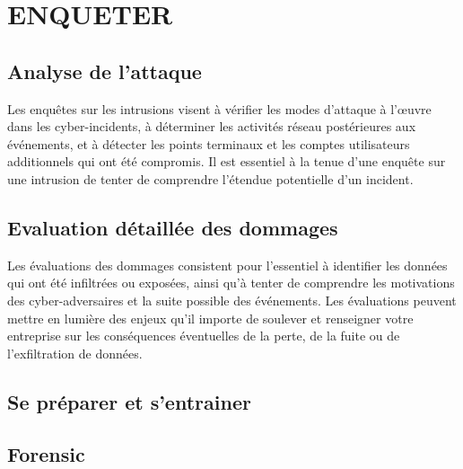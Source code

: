 %
%

\section{ENQUETER}
\subsection{Analyse de l'attaque}
Les enquêtes sur les intrusions visent à vérifier les modes d’attaque à l’œuvre dans les cyber-incidents, à déterminer
les activités réseau postérieures aux événements, et à détecter les points terminaux et les comptes utilisateurs additionnels qui ont été compromis. Il est essentiel à la tenue d’une enquête sur une intrusion de tenter de comprendre l’étendue potentielle d’un incident.

\subsection{Evaluation détaillée des dommages}

Les évaluations des dommages consistent pour l’essentiel à identifier les données qui ont été infiltrées ou exposées, ainsi qu’à tenter de comprendre les motivations des cyber-adversaires et la suite possible des événements. Les évaluations peuvent mettre en lumière des enjeux qu’il importe de soulever et renseigner votre entreprise sur les conséquences éventuelles de la perte, de la fuite ou de l’exfiltration de données.



\subsection{Se préparer et s'entrainer}


\subsection{Forensic}




